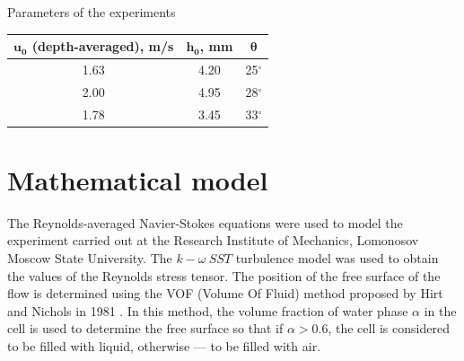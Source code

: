 \documentclass[sensors,article,submit,moreauthors,pdftex]{Definitions/mdpi}
\begin{document}
\begin{specialtable}[H]
	\caption{Parameters of the experiments\label{tabNIIMexLinear}}
	\begin{tabular}{  c  c  c  }
	\toprule
	\textbf{$\boldsymbol{u_0}$ (depth-averaged), m/s}	& \textbf{$\boldsymbol{h_0}$, mm}	& \textbf{$\boldsymbol{\theta}$}\\
	\midrule
	1.63 & 4.20 & 25$^\circ$\\
	2.00 & 4.95 & 28$^\circ$\\
	1.78 & 3.45 & 33$^\circ$\\
	\bottomrule
	\end{tabular}
\end{specialtable}
	



\section{Mathematical model}\label{math_model}

The Reynolds-averaged Navier-Stokes equations were used to model the experiment carried out at the Research Institute of Mechanics, Lomonosov Moscow State University. The $k-\omega\ SST$ turbulence model was used to obtain the values of the Reynolds stress tensor. The position of the free surface of the flow is determined using the VOF (Volume Of Fluid) method proposed by Hirt and Nichols in 1981 \cite{HirtNichols1981}. In this method, the volume fraction of water phase $\alpha$ in the cell is used to determine the free surface so that if $\alpha>0.6$, the cell is considered to be filled with liquid, otherwise --- to be filled with air.
\end{document}
